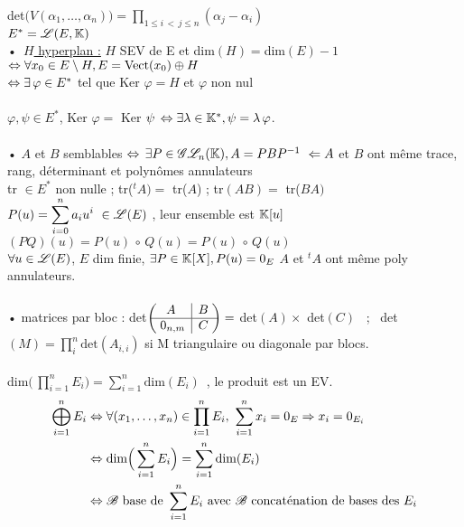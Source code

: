 \documentclass[12 pt]{book}
\begin{document}
det$\displaystyle{\big(V(\alpha_1, \hdots, \alpha_n)\big) = \prod_{1 \leqslant i \,<\, j \leqslant n} (\alpha_j - \alpha_i) }$\\
$E^* = \mathscr{L}(E,\mathbb{K})$\\
•\, \underline{$H$ hyperplan :} $H$ SEV de E et dim$(H) = $dim$(E) - 1$\\
\text{}\qquad \qquad \qquad \quad $ \Leftrightarrow \forall x_0 \in E\setminus H, E = \text{Vect}(x_0)\oplus H$\\
\text{}\qquad \qquad \qquad \quad $\Leftrightarrow \exists\,\varphi \in E^*$ tel que Ker $\varphi = H$ et $\varphi$ non nul\\
\text{}\\
$\varphi, \psi \in E^*$, Ker $\varphi =$ Ker $\psi \, \Leftrightarrow \exists \lambda \in \mathbb{K}^*, \psi = \lambda\, \varphi$.\\

\text{}\\
• $A$ et $B$ semblables $\Leftrightarrow \, \exists P \in \mathscr{G}\mathscr{L}_n(\mathbb{K}), A = P B P^{-1} \ \Leftarrow A$ et $B$ ont même trace, rang, déterminant et polynômes annulateurs\\
tr $\in E^*$ non nulle ; tr(${}^tA) = $ tr($A$) ; tr$(AB) = $ tr($BA)$\\
$\displaystyle{P(u) = \sum_{i = 0}^n a_i u^i \ \in \sL(E)}$ , leur ensemble est $\mathbb{K}[u]$ \quad $(PQ)(u) = P(u)\, \circ \,Q(u) = P(u)\, \circ \,Q(u)$\\
$\forall u \in \mathscr{L}(E)$, $E$ dim finie, $\exists P\in \mathbb{K}[X], P(u) = 0_E$ \quad $A$ et ${}^tA$ ont même poly annulateurs.\\

\text{}\\
• matrices par bloc : det$\begin{pmatrix} A & \rvline & B\; \\ \hline
\;0_{n,m} & \rvline & C\; \end{pmatrix} = $ det$(A) \times$ det$(C)$ \ ; \ det$\displaystyle{(M) = \prod_i^n \text{det}(A_{i,i}) }$ si M triangulaire ou diagonale par blocs.\\
\text{}\\
dim$\Big(\,\displaystyle{\prod_{i =1}^n E_i \Big) = \sum_{i = 1}^n \text{dim}(E_i)}$\ , le produit est un EV.\\
\begin{equation*}
\begin{aligned}
    \bigoplus_{i =1}^n E_i &\Leftrightarrow \forall (x_1, \dots, x_n)\in \prod_{i=1}^n E_i, \ \sum_{i =1}^n x_i = 0_E \Rightarrow x_i = 0_{E_i}\\
    &\Leftrightarrow \text{dim}\Big(\sum_{i=1}^n E_i \Big) = \sum_{i = 1}^n \text{dim}(E_i)\\
    &\Leftrightarrow \mathscr{B} \text{ base de } \sum_{i=1}^n E_i \text{ avec $\mathscr{B}$ concaténation de bases des } E_i\\
\end{aligned}
\end{equation*}
\end{document}
